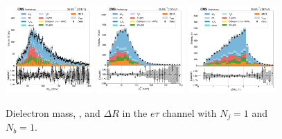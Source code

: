 \begin{figure}[htb!]
    \centering
    \includegraphics[width=0.3\textwidth]{chapters/Analysis/sectionPlots/figures/data_mc_overlays/etau_2016_cat_eq1_eq1_signal_linear_lepton_dilepton1_mass}
    \includegraphics[width=0.3\textwidth]{chapters/Analysis/sectionPlots/figures/data_mc_overlays/etau_2016_cat_eq1_eq1_signal_linear_lepton_dilepton1_pt}
    \includegraphics[width=0.3\textwidth]{chapters/Analysis/sectionPlots/figures/data_mc_overlays/etau_2016_cat_eq1_eq1_signal_linear_lepton_dilepton1_delta_r}
    \caption{Dielectron mass, \pt, and $\Delta R$ in the $e\tau$ channel
    with $N_{j} = 1$ and $N_{b} = 1$.}
    \label{fig:analysis:plots:etau_3_dilepton}
\end{figure}

